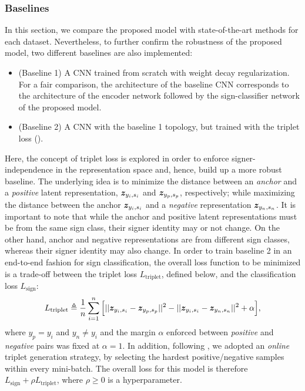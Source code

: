 \subsubsection{Baselines}
In this section, we compare the proposed model with state-of-the-art methods for each dataset. Nevertheless, to further confirm the robustness of the proposed model, two different baselines are also implemented:
\begin{itemize}
    \item (Baseline 1) A CNN trained from scratch with weight decay regularization. For a fair comparison, the architecture of the baseline CNN corresponds to the architecture of the encoder network followed by the sign-classifier network of the proposed model.
    \item (Baseline 2) A CNN with the baseline 1 topology, but trained with the triplet loss (\citet{Schroff2015}).
\end{itemize}
Here, the concept of triplet loss is explored in order to enforce signer-independence in the representation space and, hence, build up a more robust baseline. The underlying idea is to minimize the distance between an \textit{anchor} and a \textit{positive} latent representation, ${\bm{z}}_{y_{i}, s_{i}}$ and ${\bm{z}}_{y_{p}, s_{p}}$, respectively; while maximizing the distance between the anchor ${\bm{z}}_{y_{i}, s_{i}}$ and a \textit{negative} representation ${\bm{z}}_{y_{n}, s_{n}}$. It is important to note that while the anchor and positive latent representations must be from the same sign class, their signer identity may or not change. On the other hand, anchor and negative representations are from different sign classes, whereas their signer identity may also change. In order to train baseline 2 in an end-to-end fashion for sign classification, the overall loss function to be minimized is a trade-off between the triplet loss $L_{\text{triplet}}$, defined below, and the classification loss $L_{\text{sign}}$:
\begin{equation}
    L_{\text{triplet}} \triangleq \frac{1}{n}\sum_{i=1}^{n}\Big[||{\bm{z}}_{y_{i}, s_{i}}-{\bm{z}}_{y_{p}, s_{p}}||^2 - ||{\bm{z}}_{y_{i}, s_{i}}-{\bm{z}}_{y_{n}, s_{n}}||^2 + \alpha\Big],
\end{equation}
where $y_{p}=y_{i}$ and $y_{n} \neq y_{i}$ and the margin $\alpha$ enforced between \emph{positive} and \emph{negative} pairs was fixed at $\alpha=1$. In addition, following \citet{Schroff2015}, we adopted an \emph{online} triplet generation strategy, by selecting the hardest positive/negative samples within every mini-batch. The overall loss for this model is therefore $L_{\text{sign}} + \rho L_{\text{triplet}}$, where $\rho \geq 0$ is a hyperparameter.

